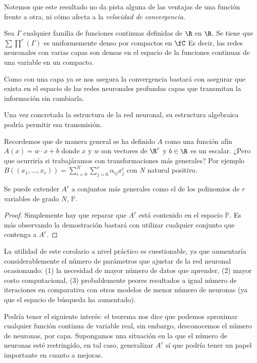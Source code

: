 Notemos que este resultado no da pista alguna de las ventajas de una función frente a otra,
 ni cómo afecta a la \textit{velocidad de convergencia}. 

\begin{corolario}

    Sea $\Gamma$ cualquier familia de funciones continuas definidas de $\R$ en $\R$. 
    Se tiene que $\sum \prod ^r (\Gamma)$ es uniformemente denso por compactos en $\fC$  
    Es decir, las redes neuronales con varias capas son densas en el  espacio de la funciones continuas de una variable en un compacto. 
\end{corolario}

    Como con una capa ya se nos asegura la convergencia bastará con asegurar que exista 
    en el espacio de las redes neuronales profundas capas que transmitan la información sin cambiarla. 

    Una vez concretada la estructura de la red neuronal,  su estructura algebraica podría permitir esa transmisión. 


Recordemos que de manera general se ha definido $A$ como una función afín 
$A(x) = w \cdot x + b$ donde $x$ y $w$ son vectores de $\R^r$  y $b \in \R$ es un escalar.  ¿Pero que ocurriría si trabajáramos con transformaciones más generales?  
Por ejemplo $B((x_1, ..., x_r)) = \sum_{i= 0} ^N \sum_{j= 0} ^r \alpha_{ij} x_j^i$  con $N$ natural positivo. 

\begin{corolario}[Generalización de A]  
    Se puede extender $A^r$ a conjuntos más generales como el de los polinomios de $r$ variables de grado $N$, $\mathbb{P}$.  
\end{corolario}
\begin{proof}
    Simplemente hay que reparar que $A^r$ está contenido en el espacio $\mathbb{P}$. 
    Es más observando la demostración bastará con utilizar cualquier conjunto que contenga a $A^r$. 
\end{proof}

La utilidad de este corolario a nivel práctico es cuestionable, ya que aumentaría considerablemente el número de 
parámetros que ajustar de la red neuronal ocasionando: (1) la necesidad de mayor número de datos que aprender, 
(2) mayor costo computacional, (3) probablemente peores resultados a igual número de iteraciones en comparativa 
con otros modelos de menor número de neuronas (ya que el espacio de búsqueda ha aumentado).

Podría tener el siguiente interés:
el teorema nos dice que podemos aproximar cualquier función continua de variable real, sin embargo, desconocemos el 
número de neuronas, por capa. Supongamos una situación en la que el número de neuronas esté restringido, en tal caso,
generalizar $A^r$ sí que podría tener un papel importante en cuanto a mejoras. 


